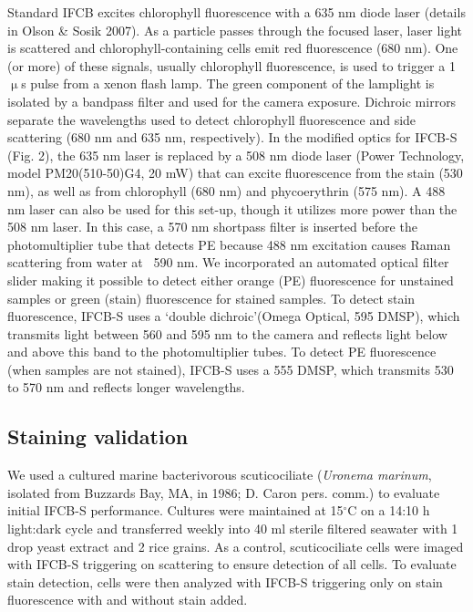Standard IFCB excites chlorophyll fluorescence with a 635 nm diode laser (details in Olson \& Sosik 2007). As a particle passes through the focused laser, laser light is scattered and chlorophyll-containing cells emit red fluorescence (680 nm). One (or more) of these signals, usually chlorophyll fluorescence, is used to trigger a 1 $\upmu$s pulse from a xenon flash lamp. The green component of the lamplight is isolated by a bandpass filter and used for the camera exposure. Dichroic mirrors separate the wavelengths used to detect chlorophyll fluorescence and side scattering
(680 nm and 635 nm, respectively). In the modified optics for IFCB-S (Fig. 2), the 635 nm laser is replaced by a 508 nm diode laser (Power Technology, model PM20(510-50)G4, 20 mW) that can excite fluorescence from the stain (530 nm), as well as from chlorophyll (680 nm) and phycoerythrin (575 nm). A 488 nm laser can also be used for this set-up, though it utilizes more power than the 508 nm laser. In this case, a 570 nm shortpass filter is inserted before the photomultiplier
tube that detects PE because 488 nm excitation causes Raman scattering from water at ~590 nm. We incorporated an automated optical filter slider making it possible to detect either orange (PE) fluorescence for unstained samples or green (stain) fluorescence for stained samples. To detect stain fluorescence, IFCB-S uses a \lq{double dichroic}\rq\hspace{0.1cm}(Omega Optical, 595 DMSP), which transmits light between 560 and 595 nm to the camera and reflects light below and above this band to the photomultiplier tubes. To detect PE fluorescence (when samples are not stained), IFCB-S uses a 555 DMSP, which transmits 530 to 570 nm and reflects longer wavelengths.


\subsection{Staining validation}

We used a cultured marine bacterivorous scuticociliate (\textit{Uronema marinum}, isolated from Buzzards Bay, MA, in 1986; D. Caron pers. comm.) to evaluate initial IFCB-S performance. Cultures were maintained at 15$^{\circ}$C on a 14:10 h light:dark cycle and transferred weekly into 40 ml sterile filtered seawater with 1 drop yeast extract and 2 rice grains. As a control, scuticociliate cells were imaged with IFCB-S triggering on scattering to ensure detection of all cells. To evaluate stain detection, cells were then analyzed with IFCB-S triggering only on stain fluorescence with and without stain added.

